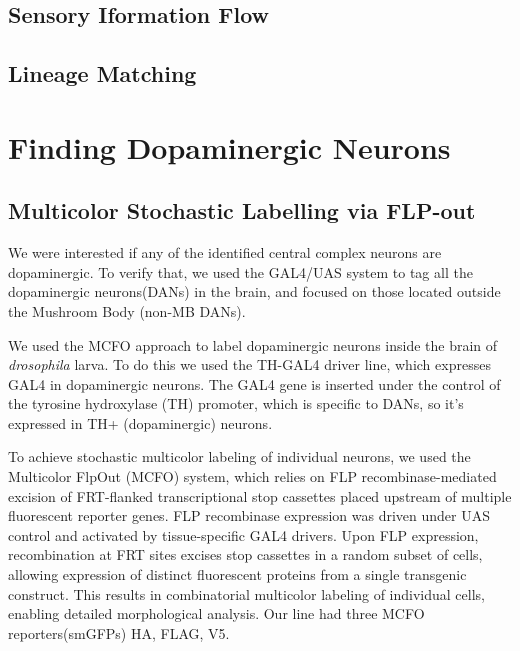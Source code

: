 \subsection{Sensory Iformation Flow}
\subsection{Lineage Matching}


\section{Finding Dopaminergic Neurons}
    \subsection{Multicolor Stochastic Labelling via FLP-out} 
    We were interested if any of the identified central complex neurons are dopaminergic. To verify that, we used the GAL4/UAS system to tag all the dopaminergic neurons(DANs) in the brain, and focused on those located outside the Mushroom Body (non-MB DANs).

    We used the MCFO approach to label dopaminergic neurons inside the brain of \textit{drosophila} larva. To do this we used the TH-GAL4 driver line, which expresses GAL4 in dopaminergic neurons. The GAL4 gene is inserted under the control of the tyrosine hydroxylase (TH) promoter, which is specific to DANs, so it’s expressed in TH+ (dopaminergic) neurons.


    To achieve stochastic multicolor labeling of individual neurons, we used the Multicolor Flp\-Out (MCFO) system, which relies on FLP recombinase-mediated excision of FRT-flanked transcriptional stop cassettes placed upstream of multiple fluorescent reporter genes. FLP recombinase expression was driven under UAS control and activated by tissue-specific GAL4 drivers. Upon FLP expression, recombination at FRT sites excises stop cassettes in a random subset of cells, allowing expression of distinct fluorescent proteins from a single transgenic construct. This results in combinatorial multicolor labeling of individual cells, enabling detailed morphological analysis.
    Our line had three MCFO reporters(smGFPs) \- HA, FLAG, V5.

